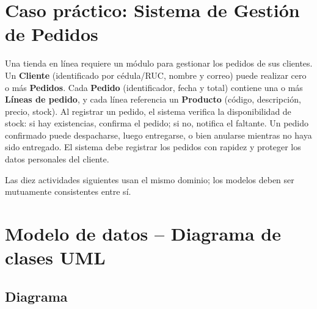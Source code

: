 \documentclass[11pt,a4paper]{article}
\begin{document}

\section*{Caso práctico: Sistema de Gestión de Pedidos}

Una tienda en línea requiere un módulo para gestionar los pedidos de sus clientes. Un
\textbf{Cliente} (identificado por cédula/RUC, nombre y correo) puede realizar cero o más
\textbf{Pedidos}. Cada \textbf{Pedido} (identificador, fecha y total) contiene una o más
\textbf{Líneas de pedido}, y cada línea referencia un \textbf{Producto} (código, descripción,
precio, stock). Al registrar un pedido, el sistema verifica la disponibilidad de stock: si hay
existencias, confirma el pedido; si no, notifica el faltante. Un pedido confirmado puede
despacharse, luego entregarse, o bien anularse mientras no haya sido entregado. El sistema debe
registrar los pedidos con rapidez y proteger los datos personales del cliente.

\bigskip

\noindent
Las diez actividades siguientes usan el mismo dominio; los modelos deben ser
mutuamente consistentes entre sí.



\section{Modelo de datos -- Diagrama de clases UML}

\subsection*{Diagrama}
\end{document}
